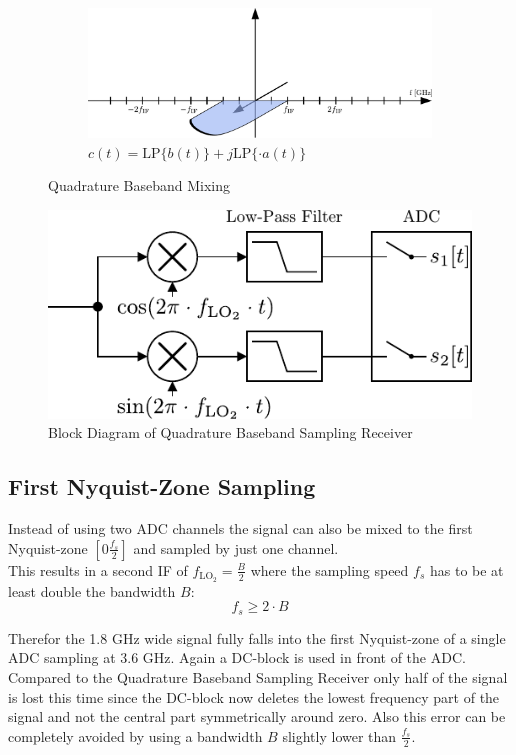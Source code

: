 \begin{figure}[h!]
\begin{subfigure}{0.45\textwidth}
    \centering
    \includegraphics[width=\textwidth]{figures/rx_adc_1_freq_c}
    \caption{$c(t) = \text{LP}\{b(t)\} + j \text{LP}\{\cdot a(t)\}$}
    \label{fig:rx_adc_1_freq_c}
  \end{subfigure}
  \caption{Quadrature Baseband Mixing}
  \label{fig:rx_adc_1_freq}
\end{figure}

\begin{figure}[h!]
  \centering
  \includegraphics[width=\textwidth]{figures/rx_adc_1_bd}
  \caption{Block Diagram of Quadrature Baseband Sampling Receiver}
  \label{fig:rx_adc_1_bd}
\end{figure}

\subsection{First Nyquist-Zone Sampling}
\label{sec:rx_adc_0}
Instead of using two \gls{ADC} channels the signal can also be mixed
to the first Nyquist-zone $[0 \frac{f_s}{2}]$ and sampled by just one
channel. \\

This results in a second \gls{IF} of $f_{\text{LO}_2} = \frac{B}{2}$ where
the sampling speed $f_s$ has to be at least double the bandwidth $B$:
\[f_s \geq 2 \cdot B\]

Therefor the 1.8 GHz wide signal fully falls into the first Nyquist-zone of
a single \gls{ADC} sampling at 3.6 GHz. Again a \gls{DC}-block
is used in front of the \gls{ADC}. Compared to the Quadrature Baseband
Sampling Receiver only half of the signal is lost this time since
the \gls{DC}-block now deletes the lowest frequency part of the signal
and not the central part symmetrically around zero. Also this error
can be completely avoided by using a bandwidth $B$ slightly lower than
$\frac{f_s}{2}$. \\

